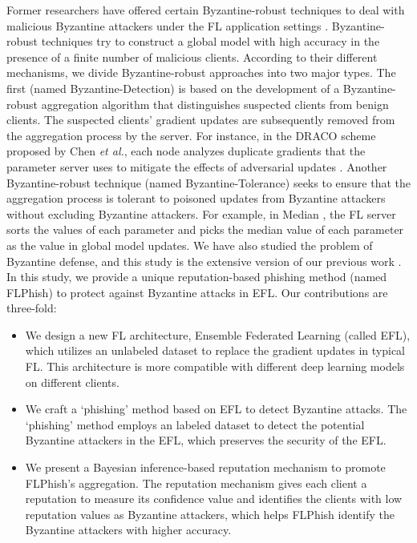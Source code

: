 \documentclass[journal]{IEEEtran}
\begin{document}
\par Former researchers have offered certain Byzantine-robust techniques to deal with malicious Byzantine attackers under the FL application settings \cite{li2021flphish, ref_12_defense,ref_13_defense,ref_15_defense,ref_16_defense,ref_17_defense,ref_28_defense,ref_29_defense,ref_30_defense,ref_31_defense,ref_32_defense}. Byzantine-robust techniques try to construct a global model with high accuracy in the presence of a finite number of malicious clients. According to their different mechanisms, we divide Byzantine-robust approaches into two major types. The first (named Byzantine-Detection) is based on the development of a Byzantine-robust aggregation algorithm that distinguishes suspected clients from benign clients. The suspected clients' gradient updates are subsequently removed from the aggregation process by the server. For instance, in the DRACO scheme proposed by Chen \textit{et al.}, each node analyzes duplicate gradients that the parameter server uses to mitigate the effects of adversarial updates \cite{ref_13_defense}. Another Byzantine-robust technique (named Byzantine-Tolerance) seeks to ensure that the aggregation process is tolerant to poisoned updates from Byzantine attackers without excluding Byzantine attackers. For example, in Median \cite{ref_16_defense}, the FL server sorts the values of each parameter and picks the median value of each parameter as the value in global model updates. We have also studied the problem of Byzantine defense, and this study is the extensive version of our previous work \cite{li2021flphish}. In this study, we provide a unique reputation-based phishing method (named FLPhish) to protect against Byzantine attacks in EFL. Our contributions are three-fold:
\begin{itemize}
  \item We design a new FL architecture, Ensemble Federated Learning (called EFL), which utilizes an unlabeled dataset to replace the gradient updates in typical FL. This architecture is more compatible with different deep learning models on different clients.
  \item We craft a `phishing' method based on EFL to detect Byzantine attacks. The `phishing' method employs an labeled dataset to detect the potential Byzantine attackers in the EFL, which preserves the security of the EFL.
  \item We present a Bayesian inference-based reputation mechanism to promote FLPhish's aggregation. The reputation mechanism gives each client a reputation to measure its confidence value and identifies the clients with low reputation values as Byzantine attackers, which helps FLPhish identify the Byzantine attackers with higher accuracy.
\end{itemize}
\end{document}
